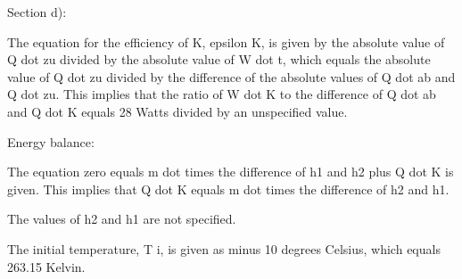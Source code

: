 Section d):

The equation for the efficiency of K, epsilon K, is given by the absolute value of Q dot zu divided by the absolute value of W dot t, which equals the absolute value of Q dot zu divided by the difference of the absolute values of Q dot ab and Q dot zu. This implies that the ratio of W dot K to the difference of Q dot ab and Q dot K equals 28 Watts divided by an unspecified value.

Energy balance:

The equation zero equals m dot times the difference of h1 and h2 plus Q dot K is given. This implies that Q dot K equals m dot times the difference of h2 and h1.

The values of h2 and h1 are not specified.

The initial temperature, T i, is given as minus 10 degrees Celsius, which equals 263.15 Kelvin.